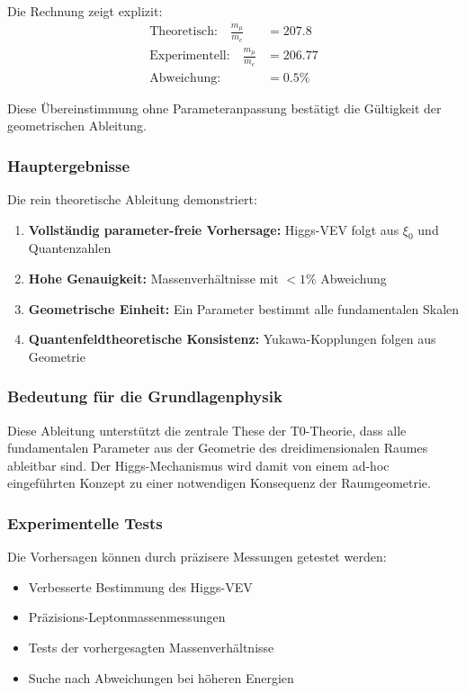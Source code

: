 \documentclass[12pt,a4paper]{article}
\begin{document}
Die Rechnung zeigt explizit:
\begin{align}
	\text{Theoretisch:} \quad \frac{m_\mu}{m_e} &= 207.8\\
	\text{Experimentell:} \quad \frac{m_\mu}{m_e} &= 206.77\\
	\text{Abweichung:} \quad &= 0.5\%
\end{align}

Diese Übereinstimmung ohne Parameteranpassung bestätigt die Gültigkeit der geometrischen Ableitung.

\subsubsection{Hauptergebnisse}

Die rein theoretische Ableitung demonstriert:

\begin{enumerate}
	\item \textbf{Vollständig parameter-freie Vorhersage:} Higgs-VEV folgt aus $\xi_0$ und Quantenzahlen
	\item \textbf{Hohe Genauigkeit:} Massenverhältnisse mit $< 1\%$ Abweichung
	\item \textbf{Geometrische Einheit:} Ein Parameter bestimmt alle fundamentalen Skalen
	\item \textbf{Quantenfeldtheoretische Konsistenz:} Yukawa-Kopplungen folgen aus Geometrie
\end{enumerate}

\subsubsection{Bedeutung für die Grundlagenphysik}

Diese Ableitung unterstützt die zentrale These der T0-Theorie, dass alle fundamentalen Parameter aus der Geometrie des dreidimensionalen Raumes ableitbar sind. Der Higgs-Mechanismus wird damit von einem ad-hoc eingeführten Konzept zu einer notwendigen Konsequenz der Raumgeometrie.

\subsubsection{Experimentelle Tests}

Die Vorhersagen können durch präzisere Messungen getestet werden:

\begin{itemize}
	\item Verbesserte Bestimmung des Higgs-VEV
	\item Präzisions-Leptonmassenmessungen
	\item Tests der vorhergesagten Massenverhältnisse
	\item Suche nach Abweichungen bei höheren Energien
\end{itemize}
\end{document}
